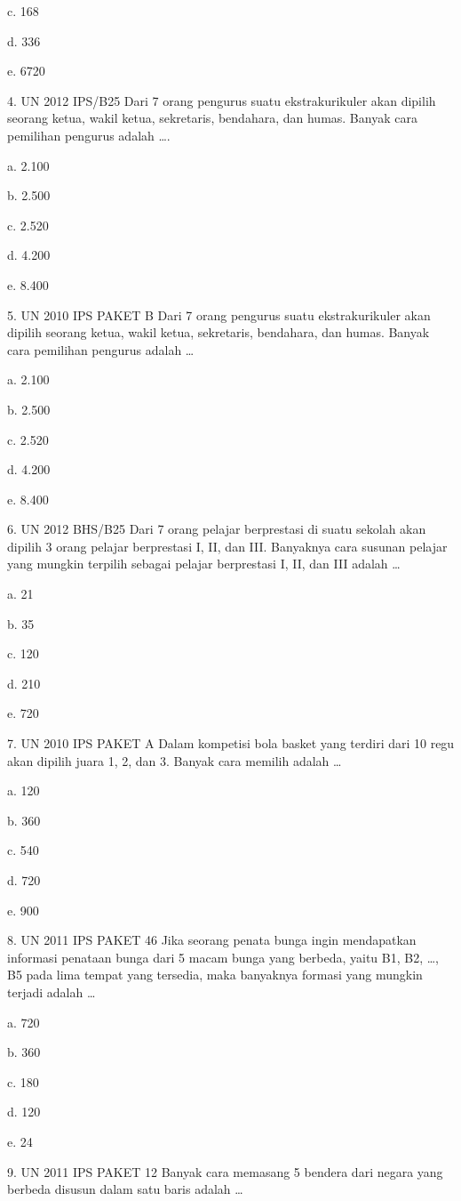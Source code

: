 \documentclass[11pt,fleqn]{book} %
\begin{document}
c.	168

d.	336

e.	6720


4.	UN 2012 IPS/B25
Dari 7 orang pengurus suatu ekstrakurikuler akan dipilih seorang ketua, wakil ketua, sekretaris, bendahara, dan humas. Banyak cara pemilihan pengurus adalah ….

a.	2.100

b.	2.500

c.	2.520


d.	4.200

e.	8.400

5.	UN 2010 IPS PAKET B 
Dari 7 orang pengurus suatu ekstrakurikuler akan dipilih seorang ketua, wakil ketua, sekretaris, bendahara, dan humas. Banyak cara pemilihan pengurus adalah …

a.	2.100

b.	2.500

c.	2.520

d.	4.200


e.	8.400

6.	UN 2012 BHS/B25
Dari 7 orang pelajar berprestasi di suatu sekolah akan dipilih 3 orang pelajar berprestasi I, II, dan III. Banyaknya cara susunan pelajar yang mungkin terpilih sebagai pelajar berprestasi I, II, dan III adalah …

a.	21

b.	35

c.	120

d.	210

e.	720


7.	UN 2010 IPS PAKET A 
Dalam kompetisi bola basket yang terdiri dari 10 regu akan dipilih juara 1, 2, dan 3. Banyak cara memilih adalah …

a.	120

b.	360

c.	540

d.	720

e.	900

8.	UN 2011 IPS PAKET 46
Jika seorang penata bunga ingin mendapatkan informasi penataan bunga dari 5 macam bunga yang berbeda, yaitu B1, B2, …, B5 pada lima tempat yang tersedia, maka banyaknya formasi yang mungkin terjadi adalah …

a.	720

b.	360

c.	180

d.	120

e.	24

9.	UN 2011 IPS PAKET 12 
Banyak cara memasang 5 bendera dari negara yang berbeda disusun dalam satu baris adalah …
\end{document}
